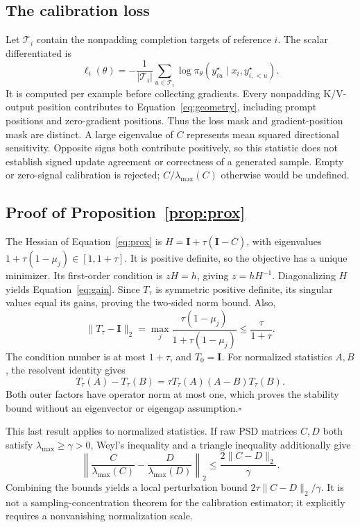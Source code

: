 \documentclass{article}
\newcommand{\I}{\mathbf I}
\newcommand{\Cbar}{\overline C}
\begin{document}
\subsection{The calibration loss}
Let $\mathcal T_i$ contain the nonpadding completion targets of reference $i$. The scalar differentiated is
\begin{equation}
\ell_i(\theta)=-\frac{1}{|\mathcal T_i|}\sum_{u\in\mathcal T_i}
\log\pi_\theta(y_{iu}^\star\mid x_i,y_{i,<u}^\star).
\end{equation}
It is computed per example before collecting gradients. Every nonpadding K/V-output position contributes to Equation~\eqref{eq:geometry}, including prompt positions and zero-gradient positions. Thus the loss mask and gradient-position mask are distinct. A large eigenvalue of $C$ represents mean squared directional sensitivity. Opposite signs both contribute positively, so this statistic does not establish signed update agreement or correctness of a generated sample. Empty or zero-signal calibration is rejected; $C/\lambda_{\max}(C)$ otherwise would be undefined.

\subsection{Proof of Proposition~\ref{prop:prox}}
The Hessian of Equation~\eqref{eq:prox} is $H=\I+\tau(\I-\Cbar)$, with eigenvalues $1+\tau(1-\mu_j)\in[1,1+\tau]$. It is positive definite, so the objective has a unique minimizer. Its first-order condition is $zH=h$, giving $z=hH^{-1}$. Diagonalizing $H$ yields Equation~\eqref{eq:gain}. Since $T_\tau$ is symmetric positive definite, its singular values equal its gains, proving the two-sided norm bound. Also,
\begin{equation}
\|T_\tau-\I\|_2=\max_j\frac{\tau(1-\mu_j)}{1+\tau(1-\mu_j)}
\le\frac{\tau}{1+\tau}.
\end{equation}
The condition number is at most $1+\tau$, and $T_0=\I$.
For normalized statistics $A,B$, the resolvent identity gives
\begin{equation}
T_\tau(A)-T_\tau(B)=\tau T_\tau(A)(A-B)T_\tau(B).
\end{equation}
Both outer factors have operator norm at most one, which proves the stability bound without an eigenvector or eigengap assumption.\hfill$\square$

This last result applies to normalized statistics. If raw PSD matrices $C,D$ both satisfy $\lambda_{\max}\ge\gamma>0$, Weyl's inequality and a triangle inequality additionally give
\begin{equation}
\left\|\frac{C}{\lambda_{\max}(C)}-\frac{D}{\lambda_{\max}(D)}\right\|_2
\le\frac{2\|C-D\|_2}{\gamma}.
\end{equation}
Combining the bounds yields a local perturbation bound $2\tau\|C-D\|_2/\gamma$. It is not a sampling-concentration theorem for the calibration estimator; it explicitly requires a nonvanishing normalization scale.
\end{document}
